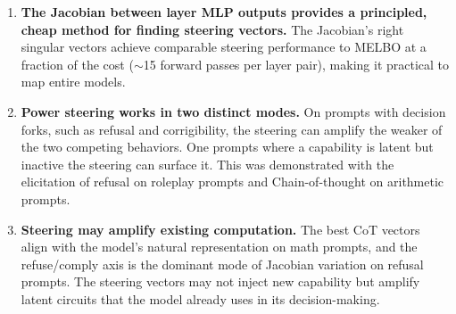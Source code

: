 \documentclass{article}
\begin{document}
\begin{enumerate}
  \item \textbf{The Jacobian between layer MLP outputs provides a principled, cheap method for finding steering vectors.} The Jacobian's right singular vectors achieve comparable steering performance to MELBO at a fraction of the cost ($\sim$15 forward passes per layer pair), making it practical to map entire models.

  \item \textbf{Power steering works in two distinct modes.} On prompts with decision forks, such as refusal and corrigibility, the steering can amplify the weaker of the two competing behaviors. One prompts where a capability is latent but inactive the steering can surface it. This was demonstrated with the elicitation of refusal on roleplay prompts and Chain-of-thought on arithmetic prompts.

  \item \textbf{Steering may amplify existing computation.} The best CoT vectors align with the model's natural representation on math prompts, and the refuse/comply axis is the dominant mode of Jacobian variation on refusal prompts. The steering vectors may not inject new capability but amplify latent circuits that the model already uses in its decision-making.
\end{enumerate}





\end{document}
